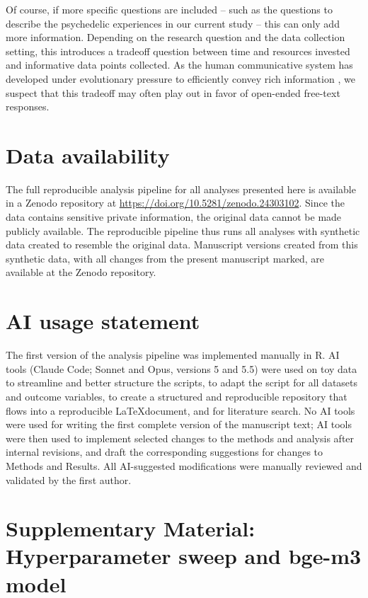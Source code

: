 \documentclass[man,floatsintext]{apa7}
\newcommand{\change}[1]{#1}
\begin{document}
Of course, if more specific questions are included -- such as the questions to describe the psychedelic experiences in our current study -- this can only add more information. Depending on the research question and the data collection setting, this introduces a tradeoff question between time and resources invested and informative data points collected. As the human communicative system has developed under evolutionary pressure to efficiently convey rich information \parencite{gibson2019efficiency}, we suspect that this tradeoff may often play out in favor of open-ended free-text responses.


\section{Data availability}

The full reproducible analysis pipeline for all analyses presented here is available in a Zenodo repository at \url{https://doi.org/10.5281/zenodo.24303102}. Since the data contains sensitive private information, the original data cannot be made publicly available. The reproducible pipeline thus runs all analyses with synthetic data created to resemble the original data. Manuscript versions created from this synthetic data, with all changes from the present manuscript marked, are available at the Zenodo repository.

\section{AI usage statement}

The first version of the analysis pipeline was implemented manually in R. AI tools (Claude Code; Sonnet and Opus, versions 5 and 5.5) were used on toy data to streamline and better structure the scripts, to adapt the script for all datasets and outcome variables, \change{to create a structured and reproducible repository that flows into a reproducible \LaTeX document,} and for literature search. No AI tools were used for writing the first complete version of the manuscript text; \change{AI tools were then used to implement selected changes to the methods and analysis after internal revisions, and draft the corresponding suggestions for changes to Methods and Results}. \change{All AI-suggested modifications were manually reviewed and validated by the first author.}

    \printbibliography


\newpage

\section{Supplementary Material: Hyperparameter sweep and bge-m3 model}
\end{document}
